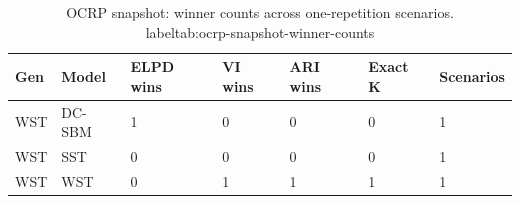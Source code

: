 \begin{table}[!h]
\centering
\caption{OCRP snapshot: winner counts across one-repetition scenarios.\\label{tab:ocrp-snapshot-winner-counts}}
\centering
\begin{tabular}[t]{lllllll}
\toprule
Gen & Model & ELPD wins & VI wins & ARI wins & Exact K & Scenarios\\
\midrule
WST & DC-SBM & 1 & 0 & 0 & 0 & 1\\
WST & SST & 0 & 0 & 0 & 0 & 1\\
WST & WST & 0 & 1 & 1 & 1 & 1\\
\bottomrule
\end{tabular}
\end{table}

